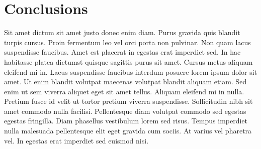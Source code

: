 
\chapter{Conclusions}
\label{conclusion}

Sit amet dictum sit amet justo donec enim diam. Purus gravida quis blandit turpis cursus. Proin fermentum leo vel orci porta non pulvinar. Non quam lacus suspendisse faucibus. Amet est placerat in egestas erat imperdiet sed. In hac habitasse platea dictumst quisque sagittis purus sit amet. Cursus metus aliquam eleifend mi in. Lacus suspendisse faucibus interdum posuere lorem ipsum dolor sit amet. Ut enim blandit volutpat maecenas volutpat blandit aliquam etiam. Sed enim ut sem viverra aliquet eget sit amet tellus. Aliquam eleifend mi in nulla. Pretium fusce id velit ut tortor pretium viverra suspendisse. Sollicitudin nibh sit amet commodo nulla facilisi. Pellentesque diam volutpat commodo sed egestas egestas fringilla. Diam phasellus vestibulum lorem sed risus. Tempus imperdiet nulla malesuada pellentesque elit eget gravida cum sociis. At varius vel pharetra vel. In egestas erat imperdiet sed euismod nisi.